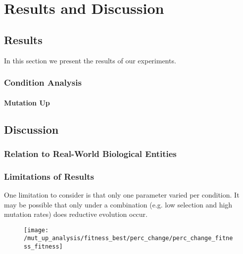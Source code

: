 \chapter{Results and Discussion}\label{ch:results_discussion}


\section{Results}\label{results}
In this section we present the results of our experiments. 

\subsection{Condition Analysis}
\subsubsection{Mutation Up}



\section{Discussion}\label{discussion}

\subsection{Relation to Real-World Biological Entities}

\subsection{Limitations of Results}\label{limitations}
One limitation to consider is that only one parameter varied per condition. It may be possible that only under a combination (e.g. low selection and high mutation rates) does reductive evolution occur. 

\begin{figure}[H]
	\texttt{[image: /mut\_up\_analysis/fitness\_best/perc\_change/perc\_change\_fitness\_fitness]}
	\centering
\end{figure}
